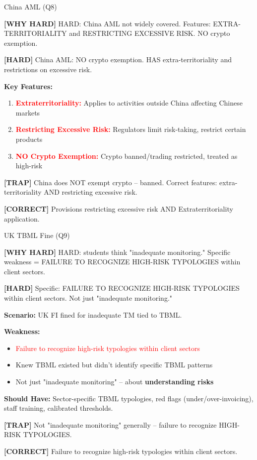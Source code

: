 \documentclass[6pt,aspectratio=169,fontsize=5pt]{beamer}
\renewcommand{\tiny}{\fontsize{3.5pt}{4.5pt}\selectfont}
\renewcommand{\normalsize}{\fontsize{7.5pt}{8.5pt}\selectfont}
\newcommand{\trap}[1]{%
	\begin{block}{\textcolor{redtrap}{\textbf{[TRAP]}}}
		\textcolor{redtrap}{\tiny #1}
	\end{block}
}
\newcommand{\correct}[1]{%
	\begin{block}{\textcolor{greencorrect}{\textbf{[CORRECT]}}}
		\textcolor{greencorrect}{\tiny #1}
	\end{block}
}
\newcommand{\hard}[1]{%
	\begin{block}{\textcolor{hardcolor}{\textbf{[HARD]}}}
		\textcolor{hardcolor}{\tiny #1}
	\end{block}
}
\newcommand{\hardexplain}[1]{%
	\begin{block}{\textcolor{orangehard}{\textbf{[WHY HARD]}}}
		\textcolor{orangehard}{\tiny #1}
	\end{block}
}
\begin{document}
	\begin{frame}{\normalsize China AML (Q8)}
		
		\hardexplain{HARD: China AML not widely covered. Features: EXTRA-TERRITORIALITY and RESTRICTING EXCESSIVE RISK. NO crypto exemption.}
		
		\hard{China AML: NO crypto exemption. HAS extra-territoriality and restrictions on excessive risk.}
		
		\textbf{Key Features:}
		\begin{enumerate}
			\item \textcolor{red}{\textbf{Extraterritoriality:}} Applies to activities outside China affecting Chinese markets
			\item \textcolor{red}{\textbf{Restricting Excessive Risk:}} Regulators limit risk-taking, restrict certain products
			\item \textcolor{red}{\textbf{NO Crypto Exemption:}} Crypto banned/trading restricted, treated as high-risk
		\end{enumerate}
		
		\trap{China does NOT exempt crypto -- banned. Correct features: extra-territoriality AND restricting excessive risk.}
		
		\correct{Provisions restricting excessive risk AND Extraterritoriality application.}
	\end{frame}
	
	\begin{frame}{\normalsize UK TBML Fine (Q9)}
		
		\hardexplain{HARD: students think "inadequate monitoring." Specific weakness = FAILURE TO RECOGNIZE HIGH-RISK TYPOLOGIES within client sectors.}
		
		\hard{Specific: FAILURE TO RECOGNIZE HIGH-RISK TYPOLOGIES within client sectors. Not just "inadequate monitoring."}
		
		\textbf{Scenario:} UK FI fined for inadequate TM tied to TBML.
		
		\textbf{Weakness:}
		\begin{itemize}
			\item \textcolor{red}{Failure to recognize high-risk typologies within client sectors}
			\item Knew TBML existed but didn't identify specific TBML patterns
			\item Not just "inadequate monitoring" -- about \textbf{understanding risks}
		\end{itemize}
		
		\textbf{Should Have:} Sector-specific TBML typologies, red flags (under/over-invoicing), staff training, calibrated thresholds.
		
		\trap{Not "inadequate monitoring" generally -- failure to recognize HIGH-RISK TYPOLOGIES.}
		
		\correct{Failure to recognize high-risk typologies within client sectors.}
	\end{frame}
	
\end{document}
